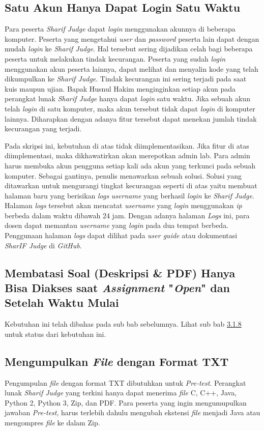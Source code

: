 \subsection{Satu Akun Hanya Dapat Login Satu Waktu}
Para peserta \textit{Sharif Judge} dapat \textit{login} menggunakan akunnya di beberapa komputer. Peserta yang mengetahui \textit{user} dan \textit{password} peserta lain dapat dengan mudah \textit{login} ke \textit{Sharif Judge}. Hal tersebut sering dijadikan celah bagi beberapa peserta untuk melakukan tindak kecurangan. Peserta yang sudah \textit{login} menggunakan akun peserta lainnya, dapat melihat dan menyalin kode yang telah dikumpulkan ke \textit{Sharif Judge}. Tindak kecurangan ini sering terjadi pada saat kuis maupun ujian. Bapak Husnul Hakim menginginkan setiap akun pada  perangkat lunak \textit{Sharif Judge} hanya dapat \textit{login} satu waktu. Jika sebuah akun telah \textit{login} di satu komputer, maka akun tersebut tidak dapat \textit{login} di komputer lainnya. Diharapkan dengan adanya fitur tersebut dapat menekan jumlah tindak kecurangan yang terjadi. 

Pada skripsi ini, kebutuhan di atas tidak diimplementasikan. Jika fitur di atas diimplementasi, maka dikhawatirkan akan merepotkan admin lab. Para admin harus membuka akun pengguna setiap kali ada akun yang terkunci pada sebuah komputer. Sebagai gantinya, penulis menawarkan sebuah solusi. Solusi yang ditawarkan untuk mengurangi tingkat kecurangan seperti di atas yaitu membuat halaman baru yang berisikan \textit{logs} \textit{username} yang berhasil \textit{login} ke \textit{Sharif Judge}. Halaman \textit{logs} tersebut akan mencatat \textit{username} yang \textit{login} menggunakan \textit{ip} berbeda dalam waktu dibawah 24 jam. Dengan adanya halaman \textit{Logs} ini, para dosen dapat memantau \textit{username} yang \textit{login} pada dua tempat berbeda. Penggunaan halaman \textit{logs} dapat dilihat pada \textit{user guide} atau dokumentasi \textit{SharIF Judge} di \textit{GitHub}.

\subsection{Membatasi Soal (Deskripsi \& PDF) Hanya Bisa Diakses saat \textit{Assignment} "\textit{Open}" dan Setelah Waktu Mulai}
Kebutuhan ini telah dibahas pada sub bab sebelumnya. Lihat sub bab \hyperref[subsec:membatasisoal]{3.1.8} untuk status dari kebutuhan ini.

\subsection{Mengumpulkan \textit{File} dengan Format TXT}
\label{subsec:filetxt}
Pengumpulan \textit{file} dengan format TXT dibutuhkan untuk \textit{Pre-test}. Perangkat lunak \textit{Sharif Judge} yang terkini hanya dapat menerima \textit{file} C, C++, Java, Python 2, Python 3, Zip, dan PDF. Para peserta yang ingin mengumupulkan jawaban \textit{Pre-test}, harus terlebih dahulu mengubah ekstensi \textit{file} menjadi Java atau mengompres \textit{file} ke dalam Zip. 

